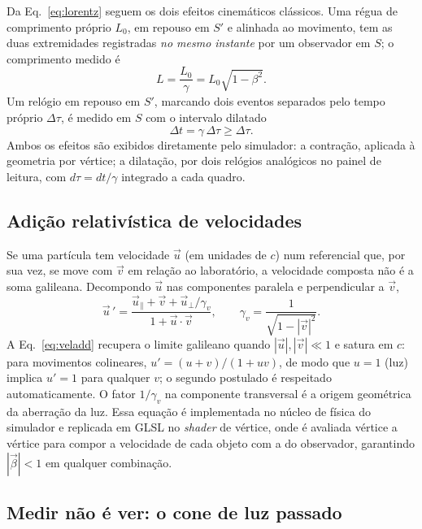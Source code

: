 \documentclass[10pt,a4paper,twocolumn]{article}
\begin{document}
Da Eq.~\eqref{eq:lorentz} seguem os dois efeitos cinemáticos clássicos. Uma régua de
comprimento próprio $L_{0}$, em repouso em $S'$ e alinhada ao movimento, tem as duas
extremidades registradas \emph{no mesmo instante} por um observador em $S$; o comprimento
medido é
\begin{equation}
  L = \frac{L_{0}}{\gamma} = L_{0}\sqrt{1-\beta^{2}}.
  \label{eq:contracao}
\end{equation}
Um relógio em repouso em $S'$, marcando dois eventos separados pelo tempo próprio
$\Delta\tau$, é medido em $S$ com o intervalo dilatado
\begin{equation}
  \Delta t = \gamma\,\Delta\tau \geq \Delta\tau .
  \label{eq:dilatacao}
\end{equation}
Ambos os efeitos são exibidos diretamente pelo simulador: a contração, aplicada à geometria
por vértice; a dilatação, por dois relógios analógicos no painel de leitura, com
$d\tau = dt/\gamma$ integrado a cada quadro.

\subsection{Adição relativística de velocidades}

Se uma partícula tem velocidade $\vec{u}$ (em unidades de $c$) num referencial que, por sua
vez, se move com $\vec{v}$ em relação ao laboratório, a velocidade composta não é a soma
galileana. Decompondo $\vec{u}$ nas componentes paralela e perpendicular a $\vec{v}$,
\begin{equation}
  \vec{u}\,' =
  \frac{\vec{u}_{\parallel} + \vec{v} + \vec{u}_{\perp}/\gamma_{v}}
       {1 + \vec{u}\cdot\vec{v}},
  \qquad
  \gamma_{v} = \frac{1}{\sqrt{1-|\vec{v}|^{2}}}.
  \label{eq:veladd}
\end{equation}
A Eq.~\eqref{eq:veladd} recupera o limite galileano quando $|\vec{u}|, |\vec{v}| \ll 1$ e
satura em $c$: para movimentos colineares, $u' = (u+v)/(1+uv)$, de modo que $u = 1$ (luz)
implica $u' = 1$ para qualquer $v$; o segundo postulado é respeitado automaticamente. O
fator $1/\gamma_{v}$ na componente transversal é a origem geométrica da aberração da luz.
Essa equação é implementada no núcleo de física do simulador e replicada em GLSL no
\emph{shader} de vértice, onde é avaliada vértice a vértice para compor a velocidade de
cada objeto com a do observador, garantindo $|\vec{\beta}| < 1$ em qualquer combinação.

\subsection{Medir não é ver: o cone de luz passado}
\label{sec:conedeluz}
\end{document}
